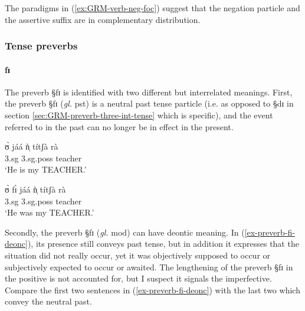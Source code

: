 The paradigms in (\ref{ex:GRM-verb-neg-foc})  suggest
that the negation particle and the assertive suffix are in complementary
distribution. 





\subsubsection{Tense preverbs}
\label{sec:GRM-verb-neg}


\paragraph{fɪ}

The preverb {\S fɪ}   is identified with two different but interrelated
meanings.  First, the preverb {\S fɪ}  ({\it gl.} {\sc pst}) is a neutral
past tense particle (i.e.  as opposed to {\S dɪ} in  section
\ref{sec:GRM-preverb-three-int-tense} which is specific), and the event referred
to in the past can no longer be in effect in the present.

\begin{exe} 
\ex\label{ex-preverb-fi-neut}
\begin{xlist}
\ex
\gll ʊ̀ jáá  ǹ̩ títʃà rà \\
  {\sc 3.sg} {\ident}    {\sc 3.sg.poss}  teacher {\foc}  \\
\glt  `He is my TEACHER.' 

\ex
\gll   ʊ̀  fɪ̀ jáá  ǹ̩ títʃà rà\\
        {\sc 3.sg} {\pst} {\ident}    {\sc 3.sg.poss}  teacher {\foc}  \\  
\glt  `He was my TEACHER.' 

\end{xlist}
\end{exe} 

 Secondly, the preverb {\S fɪ}   ({\it gl.} {\sc mod}) can have  deontic
meaning.  In (\ref{ex-preverb-fi-deonc}),  its presence still conveys  past
tense, but in addition it expresses that the situation did not really occur, yet
it was objectively supposed to occur or subjectively expected to occur or
awaited. The lengthening of the preverb {\S fɪ} in the positive  is not
accounted for, but I suspect it  signals the imperfective. Compare the first two
sentences in (\ref{ex-preverb-fi-deonc}) with the last two  which convey the
neutral past. 


